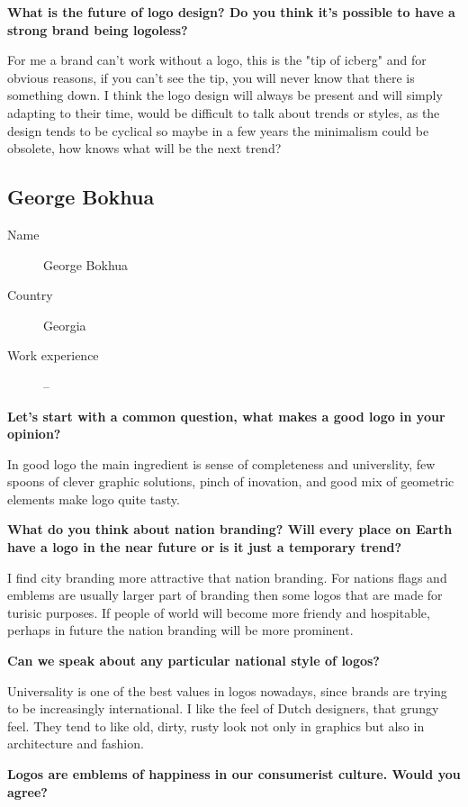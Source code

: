 \textbf{What is the future of logo design? Do you think it's possible to have a
  strong brand being logoless?}

For me a brand can't work without a logo, this is the "tip of icberg" and for
obvious reasons, if you can't see the tip, you will never know that there is
something down. I think the logo design will always be present and will simply
adapting to their time, would be difficult to talk about trends or styles, as
the design tends to be cyclical so maybe in a few years the minimalism could be
obsolete, how knows what will be the next trend?


\clearpage
\subsection{George Bokhua}

\begin{description}
\item[Name] George Bokhua
\item[Country] Georgia
\item[Work experience] --
\end{description}

\textbf{Let's start with a common question, what makes a good logo in your
  opinion?}

In good logo the main ingredient is sense of completeness and universlity, few
spoons of clever graphic solutions, pinch of inovation, and good mix of
geometric elements make logo quite tasty.


\textbf{What do you think about nation branding? Will every place on Earth have a logo
  in the near future or is it just a temporary trend?}

I find city branding more attractive that nation branding. For nations flags and
emblems are usually larger part of branding then some logos that are made for
turisic purposes. If people of world will become more friendy and hospitable,
perhaps in future the nation branding will be more prominent.


\textbf{Can we speak about any particular national style of logos?}

Universality is one of the best values in logos nowadays, since brands are
trying to be increasingly international. I like the feel of Dutch designers,
that grungy feel. They tend to like old, dirty, rusty look not only in graphics
but also in architecture and fashion.


\textbf{Logos are emblems of happiness in our consumerist culture. Would you
  agree?}

